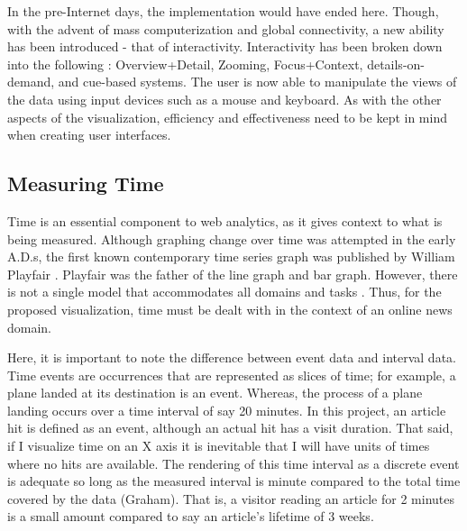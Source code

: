 \documentclass[12pt]{article}
\begin{document}
In the pre-Internet days, the implementation would have ended here. Though, with the advent of mass computerization and global connectivity, a new ability has been introduced - that of interactivity. Interactivity has been broken down into the following \cite{cockburn}: Overview+Detail, Zooming, Focus+Context, details-on-demand, and cue-based systems. The user is now able to manipulate the views of the data using input devices such as a mouse and keyboard. As with the other aspects of the visualization, efficiency and effectiveness need to be kept in mind when creating user interfaces.

\subsection{Measuring Time}
Time is an essential component to web analytics, as it gives context to what is being measured. Although graphing change over time was attempted in the early A.D.s, the first known contemporary time series graph was published by William Playfair \cite{playfair}. Playfair was the father of the line graph and bar graph. However, there is not a single model that accommodates all domains and tasks \cite{frank}. Thus, for the proposed visualization, time must be dealt with in the context of an online news domain.   

Here, it is important to note the difference between event data and interval data. Time events are occurrences that are represented as slices of time; for example, a plane landed at its destination is an event. Whereas, the process of a plane landing occurs over a time interval of say 20 minutes. In this project, an article hit is defined as an event, although an actual hit has a visit duration. That said, if I visualize time on an X axis it is inevitable that I will have units of times where no hits are available. The rendering of this time interval as a discrete event is adequate so long as the measured interval is minute compared to the total time covered by the data (Graham). That is, a visitor reading an article for 2 minutes is a small amount compared to say an article's lifetime of 3 weeks. 
\end{document}
